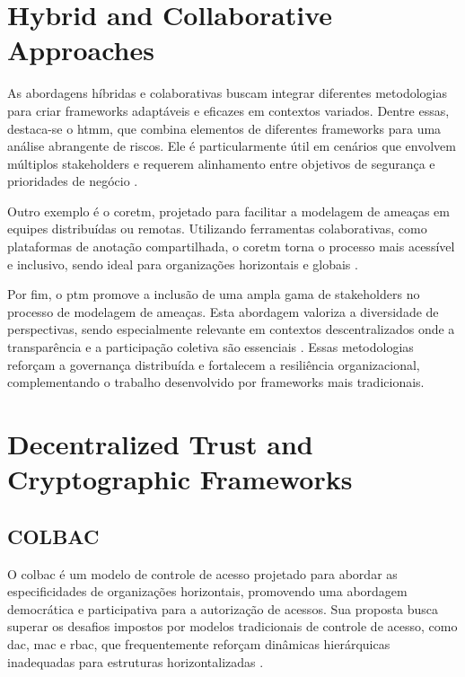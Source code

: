 \section{Hybrid and Collaborative Approaches}
\label{sec:hybrid_collaborative_approaches}

As abordagens híbridas e colaborativas buscam integrar diferentes
metodologias para criar frameworks adaptáveis e eficazes em contextos
variados. Dentre essas, destaca-se o \gls{htmm}, que combina elementos
de diferentes frameworks para uma análise abrangente de riscos.
Ele é particularmente útil em cenários que envolvem múltiplos
stakeholders e requerem alinhamento entre objetivos de segurança
e prioridades de negócio \cite{AHybridThreatModelingMethod}.

Outro exemplo é o \gls{coretm},
projetado para facilitar a modelagem de ameaças em equipes
distribuídas ou remotas. Utilizando ferramentas colaborativas, como
plataformas de anotação compartilhada, o \gls{coretm} torna o processo mais
acessível e inclusivo, sendo ideal para organizações horizontais e
globais \cite{CoReTM}.

Por fim, o \gls{ptm} promove a inclusão de
uma ampla gama de stakeholders no processo de modelagem de ameaças.
Esta abordagem valoriza a diversidade de perspectivas, sendo
especialmente relevante em contextos descentralizados onde a
transparência e a participação coletiva são essenciais
\cite{ParticipatoryThreatModelling}. Essas metodologias reforçam a
governança distribuída e fortalecem a resiliência organizacional,
complementando o trabalho desenvolvido por frameworks mais
tradicionais.



\section{Decentralized Trust and Cryptographic Frameworks}
\label{sec:decentralized_cryptographic}

\subsection{COLBAC}
\label{subsec:colbac}

O \gls{colbac} é um modelo de controle de
acesso projetado para abordar as especificidades de organizações
horizontais, promovendo uma abordagem democrática e participativa para
a autorização de acessos. Sua proposta busca superar os desafios
impostos por modelos tradicionais de controle de acesso, como
\gls{dac}, \gls{mac} e \gls{rbac}, que frequentemente reforçam dinâmicas
hierárquicas inadequadas para estruturas horizontalizadas \cite{Colbac}.


